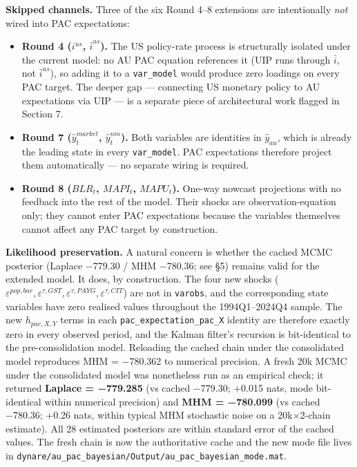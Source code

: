 \documentclass[
]{article}
\newcounter{none} %
\providecommand{\tightlist}{%
  \setlength{\itemsep}{0pt}\setlength{\parskip}{0pt}}
\begin{document}
\textbf{Skipped channels.} Three of the six Round 4--8 extensions are
intentionally \emph{not} wired into PAC expectations:

\begin{itemize}
\tightlist
\item
  \textbf{Round 4 (\(i^{us}\), \(\bar{i}^{us}\)).} The US policy-rate
  process is structurally isolated under the current model: no AU PAC
  equation references it (UIP runs through \(\bar{i}\), not
  \(\bar{i}^{us}\)), so adding it to a \texttt{var\_model} would produce
  zero loadings on every PAC target. The deeper gap --- connecting US
  monetary policy to AU expectations via UIP --- is a separate piece of
  architectural work flagged in Section 7.
\item
  \textbf{Round 7 (\(\hat{y}^{market}_t\), \(\hat{y}^{nm}_t\)).} Both
  variables are identities in \(\hat{y}_{au}\), which is already the
  leading state in every \texttt{var\_model}. PAC expectations therefore
  project them automatically --- no separate wiring is required.
\item
  \textbf{Round 8 (\(BLR_t\), \(MAPI_t\), \(MAPU_t\)).} One-way nowcast
  projections with no feedback into the rest of the model. Their shocks
  are observation-equation only; they cannot enter PAC expectations
  because the variables themselves cannot affect any PAC target by
  construction.
\end{itemize}

\textbf{Likelihood preservation.} A natural concern is whether the
cached MCMC posterior (Laplace −779.30 / MHM −780.36; see §5) remains
valid for the extended model. It does, by construction. The four new
shocks
(\(\varepsilon^{pop,bar}, \varepsilon^{\tau,GST}, \varepsilon^{\tau,PAYG}, \varepsilon^{\tau,CIT}\))
are not in \texttt{varobs}, and the corresponding state variables have
zero realised values throughout the 1994Q1--2024Q4 sample. The new
\(h_{pac,X,Y}\) terms in each \texttt{pac\_expectation\_pac\_X} identity
are therefore exactly zero in every observed period, and the Kalman
filter's recursion is bit-identical to the pre-consolidation model.
Reloading the cached chain under the consolidated model reproduces MHM =
−780.362 to numerical precision. A fresh 20k MCMC under the consolidated
model was nonetheless run as an empirical check; it returned
\textbf{Laplace = −779.285} (vs cached −779.30; +0.015 nats, mode
bit-identical within numerical precision) and \textbf{MHM = −780.099}
(vs cached −780.36; +0.26 nats, within typical MHM stochastic noise on a
20k×2-chain estimate). All 28 estimated posteriors are within standard
error of the cached values. The fresh chain is now the authoritative
cache and the new mode file lives in
\texttt{dynare/au\_pac\_bayesian/Output/au\_pac\_bayesian\_mode.mat}.
\end{document}
